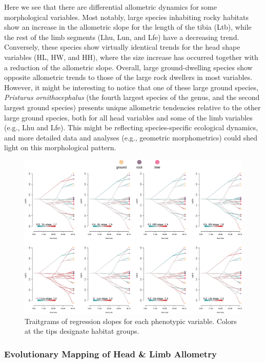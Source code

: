 \documentclass[
  11pt,
]{article}
\begin{document}
Here we see that there are differential allometric dynamics for some
morphological variables. Most notably, large species inhabiting rocky
habitats show an increase in the allometric slope for the length of the
tibia (Ltb), while the rest of the limb segments (Lhu, Lun, and Lfe)
have a decreasing trend. Conversely, these species show virtually
identical trends for the head shape variables (HL, HW, and HH), where
the size increase has occurred together with a reduction of the
allometric slope. Overall, large ground-dwelling species show opposite
allometric trends to those of the large rock dwellers in most variables.
However, it might be interesting to notice that one of these large
ground species, \emph{Pristurus ornithocephalus} (the fourth largest
species of the genus, and the second largest ground species) presents
unique allometric tendencies relative to the other large ground species,
both for all head variables and some of the limb variables (e.g., Lhu
and Lfe). This might be reflecting species-specific ecological dynamics,
and more detailed data and analyses (e.g., geometric morphometrics)
could shed light on this morphological pattern.

\begin{figure}[H]

{\centering \includegraphics[width=0.9\linewidth]{Figs/figure_sup_phenograms_slope_variables} 

}

\caption{Traitgrams of regression slopes for each phenotypic variable. Colors at the tips designate habitat groups.}\label{fig:unnamed-chunk-5}
\end{figure}

\newpage

\hypertarget{evolutionary-mapping-of-head-limb-allometry}{%
\subsubsection{Evolutionary Mapping of Head \& Limb
Allometry}\label{evolutionary-mapping-of-head-limb-allometry}}
\end{document}
